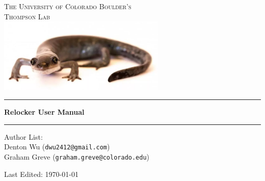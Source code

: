 \documentclass[10pt]{report}
\begin{document}
\begin{titlepage}
	\begin{center}
	\vspace{45mm} %
	\hspace{17mm}
  	
  	\vspace{20mm}
	\textsc{\Large The University of Colorado Boulder's \\ \vspace{5mm} \huge  Thompson Lab}\\[18mm]
	
	\hspace{20mm}
	\includegraphics[width=80mm]{includes/salamander.png}\newline\\\vspace{20mm}
	\hrule \vspace{4mm}
	{ \huge \bfseries Relocker User Manual}\\[0.4cm]
	\hrule

	\vspace{10mm} \large
	Author List: \\
	Denton Wu (\texttt{dwu2412@gmail.com}) \\
	Graham Greve (\texttt{graham.greve@colorado.edu}) \\
	\vfill

	{Last Edited: \today}
	\end{center}
\end{titlepage}
\cleardoublepage
\tableofcontents
\cleardoublepage


\setcounter{secnumdepth}{0}
\end{document}
